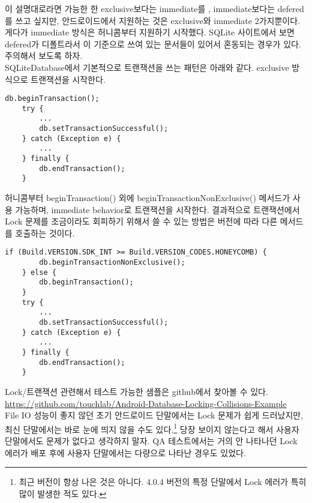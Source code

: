 이 설명대로라면 가능한 한 exclusive보다는 immediate를 , immediate보다는 defered를 쓰고 싶지만, 
안드로이드에서 지원하는 것은 exclusive와 immediate 2가지뿐이다. 게다가 immediate 방식은 허니콤부터 지원하기 시작했다.
SQLite 사이트에서 보면 defered가 디폴트라서 이 기준으로 쓰여 있는 문서들이 있어서 혼동되는 경우가 있다. 주의해서 보도록 하자.\\

SQLiteDatabase에서 기본적으로 트랜잭션을 쓰는 패턴은 아래와 같다. 
exclusive 방식으로 트랜잭션을 시작한다.
\begin{lstlisting}[frame=single] 
	db.beginTransaction();
   	try {
     	...
     	db.setTransactionSuccessful();
	} catch (Exception e) {
		...
   	} finally {
     	db.endTransaction();
   	}
\end{lstlisting}

허니콤부터 beginTransaction() 외에 beginTransactionNonExclusive() 메서드가 사용 가능하며, immediate behavior로 트랜잭션을 시작한다.
결과적으로 트랜잭션에서 Lock 문제를 조금이라도 회피하기 위해서 쓸 수 있는 방법은 버전에 따라 다른 메서드를 호출하는 것이다.
\begin{lstlisting}[frame=single] 
	if (Build.VERSION.SDK_INT >= Build.VERSION_CODES.HONEYCOMB) {
		db.beginTransactionNonExclusive();
	} else {
		db.beginTransaction();
	}
   	try {
     	...
     	db.setTransactionSuccessful();
	} catch (Exception e) {
		...
   	} finally {
     	db.endTransaction();
   	}
\end{lstlisting}

Lock/트랜잭션 관련해서 테스트 가능한 샘플은 github에서 찾아볼 수 있다.\\
\url{https://github.com/touchlab/Android-Database-Locking-Collisions-Example}\\

File IO 성능이 좋지 않던 초기 안드로이드 단말에서는 Lock 문제가 쉽게 드러났지만, 최신 단말에서는 바로 눈에 띄지 않을 수도 있다.\footnote{최근 버전이 항상 나은 것은 아니다. 4.0.4 버전의 특정 단말에서 Lock 에러가 특히 많이 발생한 적도 있다.} 당장 보이지 않는다고 해서 사용자 단말에서도 문제가 없다고 생각하지 말자. QA 테스트에서는 거의 안 나타나던 Lock 에러가 배포 후에 사용자 단말에서는 다량으로 나타난 경우도 있었다.\\

